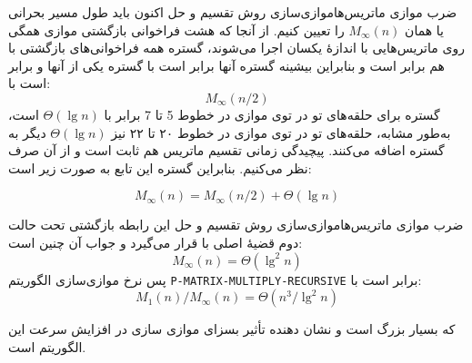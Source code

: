 \begin{itemframe-s}{ضرب موازی ماتریس‌ها}{موازی‌سازی روش تقسیم و حل}
\itm
اکنون باید طول مسیر بحرانی یا همان
$M_\infty(n)$
را تعیین کنیم. از آنجا که هشت فراخوانی بازگشتی موازی همگی روی ماتریس‌هایی با اندازهٔ یکسان اجرا می‌شوند، گستره همه فراخوانی‌های بازگشتی با هم برابر است و بنابراین بیشینه گستره آنها برابر است با گستره یکی از آنها و برابر است با:
$$
M_\infty(n/2)
$$
\itm
گستره برای حلقه‌های تو در توی موازی در خطوط 5 تا 7 برابر با
$\Theta(\lg n)$
است، به‌طور مشابه، حلقه‌های تو در توی موازی در خطوط ۲۰ تا ۲۲ نیز
$\Theta(\lg n)$
دیگر به گستره اضافه می‌کنند.
پیچیدگی زمانی تقسیم ماتریس هم ثابت است و از آن صرف نظر می‌کنیم.
 بنابراین گستره این تابع به صورت زیر است:

$$M_\infty(n) = M_\infty(n/2) + \Theta(\lg n)$$
\end{itemframe-s}


\begin{itemframe-s}{ضرب موازی ماتریس‌ها}{موازی‌سازی روش تقسیم و حل}
\itm
این رابطه بازگشتی تحت حالت دوم قضیهٔ اصلی با قرار می‌گیرد و جواب آن چنین است:
$$
M_\infty(n) = \Theta(\lg^2 n)
$$
\itm
پس نرخ موازی‌سازی الگوریتم
\texttt{P-MATRIX-MULTIPLY-RECURSIVE}
برابر است با:
$$
M_1(n) / M_\infty(n) = \Theta(n^3 / \lg^2 n)
$$

که بسیار بزرگ است و نشان دهنده تأثیر بسزای موازی سازی در افزایش سرعت این الگوریتم است.
\end{itemframe-s}